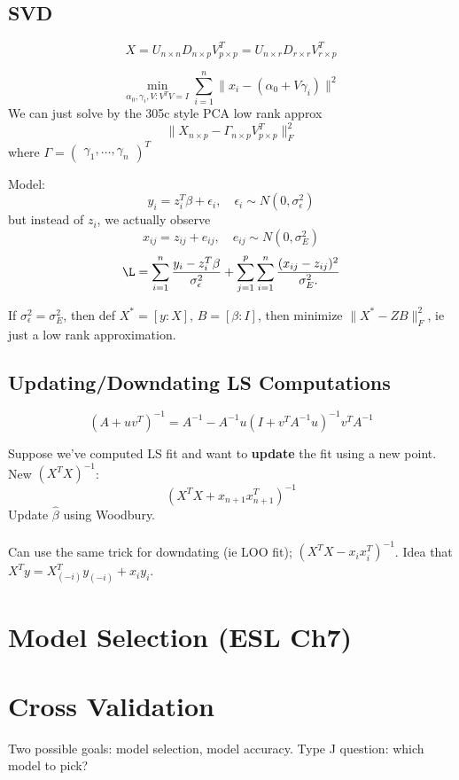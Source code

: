 \documentclass{article}
\begin{document}
\subsection{SVD}
$$X = U_{n\times n} D_{n\times p} V^T_{p\times p} = U_{n\times r} D_{r\times r} V^T_{r\times p}$$
\begin{example}
    $$\min_{\alpha_0,\gamma_i, V:V^T V  =I } \sum_{i=1}^n \|x_i - (\alpha_0 + V\gamma_i)\|^2 $$
We can just solve by the 305c style PCA low rank approx 
    $$\|X_{n\times p} - \Gamma_{n\times p} V_{p\times p}^T \|_F^2 $$
    where $\Gamma = \begin{pmatrix}
        \gamma_1,\ldots ,\gamma_n
    \end{pmatrix}^T$
\end{example}
\begin{example}
Model:
$$y_i = z_i^T \beta + \epsilon_i, \quad \epsilon_i \sim N(0,\sigma^2_\epsilon) $$
but instead of $z_i$, we actually observe $$x_{ij} = z_{ij} + e_{ij}, \quad e_{ij}\sim N(0,\sigma^2_E) $$
$$\L = \sum_{i=1}^n \frac{y_i - z_i^T \beta}{\sigma^2_\epsilon} + \sum_{j=1}^p \sum_{i=1}^n \frac{(x_{ij} - z_{ij})^2}{\sigma^2_E.}$$

If $\sigma^2_\epsilon = \sigma^2_E$, then def $X^* = [y:X]$, $B = [\beta:I]$, then minimize $\|X^* -ZB\|_F^2 $, ie just a low rank approximation. 
\end{example}
\subsection{Updating/Downdating LS Computations}
\begin{fact}
    $$(A+uv^T)^{-1} = A^{-1} - A^{-1} u(I + v^T A^{-1} u)^{-1} v^T A^{-1} $$
\end{fact}
Suppose we've computed LS fit and want to \textbf{update} the fit using a new point. New $(X^TX)^{-1}$:
$$(X^TX + x_{n+1}x_{n+1}^T)^{-1} $$
Update $\hat \beta$ using Woodbury.\\\\
Can use the same trick for downdating (ie LOO fit); $(X^TX - x_ix_i^T)^{-1}$. Idea that $X^T y = X_{(-i)}^T y_{(-i)} + x_i y_i $.

\section{Model Selection (ESL Ch7)}

\section{Cross Validation}
Two possible goals: model selection, model accuracy. Type J question: which model to pick? 
\end{document}
